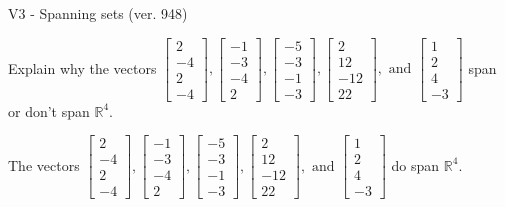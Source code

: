 \begin{exercise}
  \begin{exerciseTitle}V3 - Spanning sets (ver. 948)\end{exerciseTitle}
  \begin{exerciseStatement}
    Explain why the vectors \(\left[\begin{array}{r}
2 \\
-4 \\
2 \\
-4
\end{array}\right] , \left[\begin{array}{r}
-1 \\
-3 \\
-4 \\
2
\end{array}\right] , \left[\begin{array}{r}
-5 \\
-3 \\
-1 \\
-3
\end{array}\right] , \left[\begin{array}{r}
2 \\
12 \\
-12 \\
22
\end{array}\right] , \text{ and } \left[\begin{array}{r}
1 \\
2 \\
4 \\
-3
\end{array}\right]\) span or don't span \(\mathbb{R}^4\). 
	


  \end{exerciseStatement}
  \begin{exerciseAnswer}
   The vectors \(\left[\begin{array}{r}
2 \\
-4 \\
2 \\
-4
\end{array}\right] , \left[\begin{array}{r}
-1 \\
-3 \\
-4 \\
2
\end{array}\right] , \left[\begin{array}{r}
-5 \\
-3 \\
-1 \\
-3
\end{array}\right] , \left[\begin{array}{r}
2 \\
12 \\
-12 \\
22
\end{array}\right] , \text{ and } \left[\begin{array}{r}
1 \\
2 \\
4 \\
-3
\end{array}\right]\) 
  	 do  
	span \(\mathbb{R}^4\).
  



\end{exerciseAnswer}
\end{exercise}
